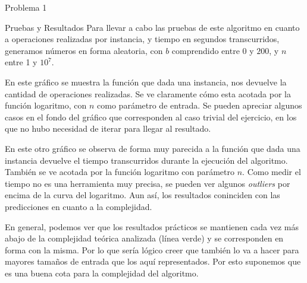 \begin{section}{Problema 1}
\begin{subsection}{Pruebas y Resultados}
		Para llevar a cabo las pruebas de este algoritmo en cuanto a operaciones realizadas por instancia, y tiempo en segundos transcurridos, generamos números en forma aleatoria, con $b$ comprendido entre $0$ y $200$, y $n$ entre 1 y $10^7$.\\
		
		\VSP
		
		En este gráfico se muestra la función que dada una instancia, nos devuelve la cantidad de operaciones realizadas. Se ve claramente cómo esta acotada por la función logaritmo, con $n$ como parámetro de entrada. Se pueden apreciar algunos casos en el fondo del gráfico que co\-rres\-pon\-den al caso trivial del ejercicio, en los que no hubo necesidad de iterar para llegar al resultado.

		\VSP

		En este otro gráfico se observa de forma muy parecida a la función que dada una instancia devuelve el tiempo transcurridos durante la ejecución del algoritmo. También se ve acotada por la función logaritmo con parámetro $n$. Como medir el tiempo no es una herramienta muy precisa, se pueden ver algunos {\em outliers} por encima de la curva del logaritmo. Aun así, los resultados coninciden con las predicciones en cuanto a la complejidad.\Pa

		En general, podemos ver que los resultados prácticos se mantienen cada vez más abajo de la complejidad teórica analizada (línea verde) y se corresponden en forma con la misma. Por lo que sería lógico creer que también lo va a hacer para mayores tamaños de entrada que los aquí representados.
		Por esto suponemos que es una buena cota para la complejidad del algoritmo.
	\end{subsection}

\end{section}

